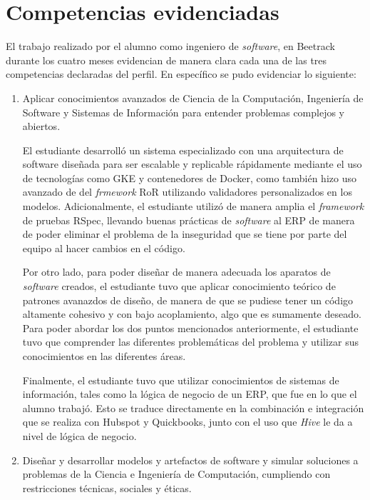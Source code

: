 \section{Competencias evidenciadas}

  El trabajo realizado por el alumno como ingeniero de \textit{software}, en Beetrack durante los cuatro meses evidencian de manera clara cada una de las tres competencias declaradas del perfil. En específico se pudo evidenciar lo siguiente:

  \begin{enumerate}
    \item Aplicar conocimientos avanzados de Ciencia de la Computación, Ingeniería de Software y Sistemas de Información para entender problemas complejos y abiertos.
    
    El estudiante desarrolló un sistema especializado con una arquitectura de software diseñada para ser escalable y replicable rápidamente mediante el uso de tecnologías como GKE y contenedores de Docker, como también hizo uso avanzado de del \textit{frmework} RoR utilizando validadores personalizados en los modelos. Adicionalmente, el estudiante utilizó de manera amplia el \textit{framework} de pruebas RSpec, llevando buenas prácticas de \textit{software} al ERP de manera de poder eliminar el problema de la inseguridad que se tiene por parte del equipo al hacer cambios en el código.

    Por otro lado, para poder diseñar de manera adecuada los aparatos de \textit{software} creados, el estudiante tuvo que aplicar conocimiento teórico de patrones avanazdos de diseño, de manera de que se pudiese tener un código altamente cohesivo y con bajo acoplamiento, algo que es sumamente deseado. Para poder abordar los dos puntos mencionados anteriormente, el estudiante tuvo que comprender las diferentes problemáticas del problema y utilizar sus conocimientos en las diferentes áreas.

    Finalmente, el estudiante tuvo que utilizar conocimientos de sistemas de información, tales como la lógica de negocio de un ERP, que fue en lo que el alumno trabajó. Esto se traduce directamente en la combinación e integración que se realiza con Hubspot y Quickbooks, junto con el uso que \textit{Hive} le da a nivel de lógica de negocio.

    \item Diseñar y desarrollar modelos y artefactos de software y simular soluciones a problemas de la Ciencia e Ingeniería de Computación, cumpliendo con restricciones técnicas, sociales y éticas.
    

\end{enumerate}
